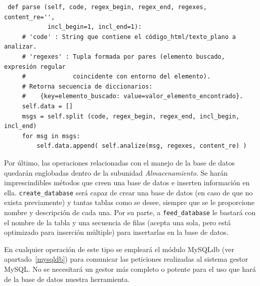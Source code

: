 {\begin{verbatim}
 def parse (self, code, regex_begin, regex_end, regexes, content_re='',
            incl_begin=1, incl_end=1):
     # 'code' : String que contiene el código_html/texto_plano a analizar.
     # 'regexes' : Tupla formada por pares (elemento buscado, expresión regular
     #             coincidente con entorno del elemento).
     # Retorna secuencia de diccionarios:
     #    {key=elemento_buscado: value=valor_elemento_encontrado}.
     self.data = []
     msgs = self.split (code, regex_begin, regex_end, incl_begin, incl_end)
     for msg in msgs:
         self.data.append( self.analize(msg, regexes, content_re) )
\end{verbatim}
}

Por último, las operaciones relacionadas con el manejo de la base de datos
quedarán englobadas dentro de la subunidad \textit{Almacenamiento}.
Se harán imprescindibles métodos que creen una base de datos e inserten
información en ella. \texttt{create\_database} será capaz de crear una base
de datos (en caso de que no exista previamente) y tantas tablas como se desee,
siempre que se le proporcione nombre y descripción de cada una.
Por su parte, a \texttt{feed\_database} le bastará con el nombre de la tabla
y una secuencia de filas (acepta una sola, pero está optimizado para inserción
múltiple) para insertarlas en la base de datos.

En cualquier operación de este tipo se empleará el módulo MySQLdb
(ver apartado~\ref{mysqldb}) para comunicar las peticiones realizadas al sistema
gestor MySQL. No se necesitará un gestor más completo o potente para el uso
que hará de la base de datos nuestra herramienta.

